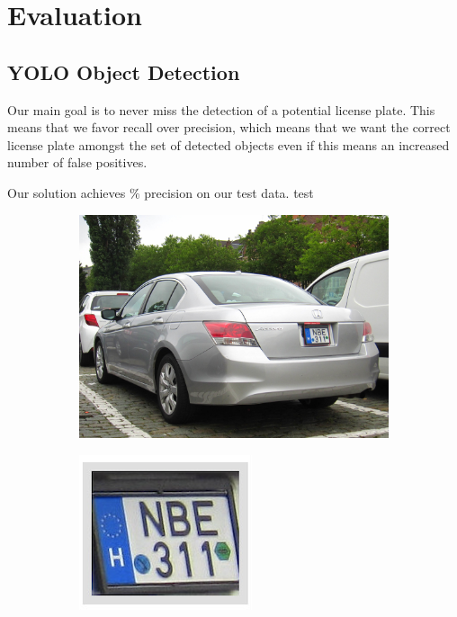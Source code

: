 \section{Evaluation}
\subsection{YOLO Object Detection}
Our main goal is to never miss the detection of a potential license plate. This
means that we favor recall over precision, which means that we want the correct
license plate amongst the set of detected objects even if this means an
increased number of false positives.

Our solution achieves \todo{}$\%$ precision on our test data. test

\begin{figure}
    \begin{subfigure}[b]{.55\textwidth}
        \includegraphics[width=\textwidth]{figures/yolo/1000.jpg}
    \end{subfigure}
    \hfill
    \begin{subfigure}[b]{.15\textwidth}
        \includegraphics[width=\textwidth]{figures/yolo/1000_montage.png}

\end{subfigure}
\end{figure}
